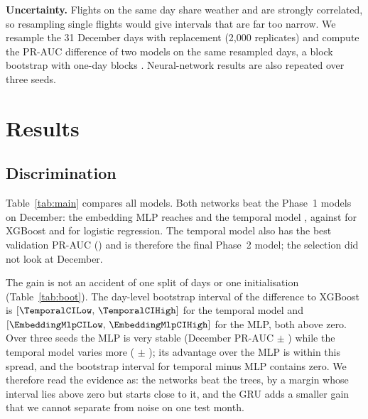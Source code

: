 \documentclass[conference]{IEEEtran}
\begin{document}
\textbf{Uncertainty.} Flights on the same day share weather and are strongly correlated,
so resampling single flights would give intervals that are far too narrow. We resample
the 31 December days with replacement (2{,}000 replicates) and compute the PR-AUC
difference of two models on the same resampled days, a block bootstrap with one-day
blocks \cite{kunsch1989}. Neural-network results are also repeated over three seeds.

\section{Results}
\subsection{Discrimination}
Table~\ref{tab:main} compares all models. Both networks beat the Phase~1 models on
December: the embedding MLP reaches \EmbeddingMlpTestPR{} and the temporal model
\TemporalTestPR{}, against \XgboostTestPR{} for XGBoost and \LrTestPR{} for logistic
regression. The temporal model also has the best validation PR-AUC (\TemporalValPR) and
is therefore the final Phase~2 model; the selection did not look at December.

\begin{table}[t]
\centering
\caption{Validation and December results (raw probabilities, seed 42). Recall@P$\geq$0.5
is read off the December curve.}
\label{tab:main}
\resizebox{\columnwidth}{!}{}
\end{table}

The gain is not an accident of one split of days or one initialisation
(Table~\ref{tab:boot}). The day-level bootstrap interval of the difference to XGBoost is
$[\TemporalCILow,\,\TemporalCIHigh]$ for the temporal model and
$[\EmbeddingMlpCILow,\,\EmbeddingMlpCIHigh]$ for the MLP, both above zero. Over three
seeds the MLP is very stable (December PR-AUC \MLPSeedMean{} $\pm$ \MLPSeedStd) while the
temporal model varies more (\TemporalSeedMean{} $\pm$ \TemporalSeedStd); its advantage
over the MLP is within this spread, and the bootstrap interval for temporal minus MLP
contains zero. We therefore read the evidence as: the networks beat the trees, by a
margin whose interval lies above zero but starts close to it, and the GRU adds a
smaller gain that we cannot separate from noise on one test month.

\begin{table}[t]
\centering
\caption{Paired day-level bootstrap of the December PR-AUC difference (2{,}000
replicates). ``Share $>0$'': fraction of replicates in which the first model wins.}
\label{tab:boot}
\resizebox{\columnwidth}{!}{}
\end{table}
\end{document}
